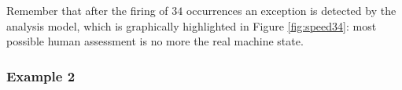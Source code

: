 







Remember that after the firing of $34$ occurrences 
an exception is detected by the analysis model, 
which is graphically highlighted in Figure \ref{fig:speed34}: 
most possible human assessment is no more the real machine state.

\subsubsection{Example 2}



